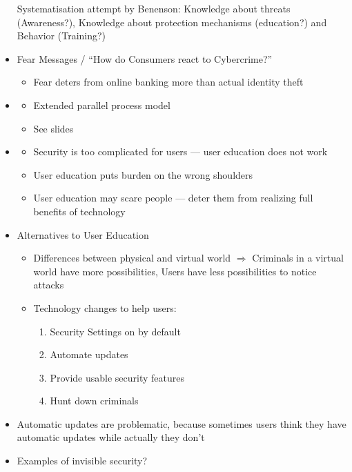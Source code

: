 \documentclass[a4paper,12pt]{scrartcl}
\begin{document}
\begin{itemize}
		Systematisation attempt by Benenson: Knowledge about threats (Awareness?), Knowledge about protection mechanisms (education?) and Behavior (Training?)
	\item
		Fear Messages / \enquote{How do Consumers react to Cybercrime?}
		\begin{itemize}
			\item
				Fear deters from online banking more than actual identity theft
		\end{itemize}
	\item
		\begin{itemize}
			\item
				Extended parallel process model
			\item
				See slides
		\end{itemize}
	\item
		\begin{itemize}
			\item
				Security is too complicated for users --- user education does not work
			\item
				User education puts burden on the wrong shoulders
			\item
				User education may scare people --- deter them from realizing full benefits of technology
		\end{itemize}
	\item
		Alternatives to User Education
		\begin{itemize}
			\item
				Differences between physical and virtual world $\Rightarrow$ Criminals in a virtual world have more possibilities, Users have less possibilities to notice attacks
			\item
				Technology changes to help users:
				\begin{enumerate}
					\item
						Security Settings on by default
					\item
						Automate updates
					\item
						Provide usable security features
					\item
						Hunt down criminals
				\end{enumerate}
		\end{itemize}
	\item
		Automatic updates are problematic, because sometimes users think they have automatic updates while actually they don't
	\item
		Examples of invisible security?


\end{itemize}
\end{document}
